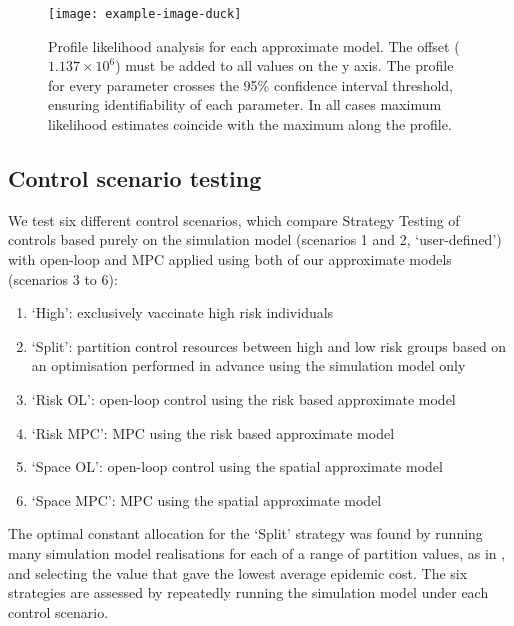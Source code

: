 \begin{figure}[h]
    \begin{center}
        \texttt{[image: example-image-duck]}
        \caption{Profile likelihood analysis for each approximate model. The offset ($1.137\times10^6$) must be added to all values on the y axis. The profile for every parameter crosses the 95\% confidence interval threshold, ensuring identifiability of each parameter. In all cases maximum likelihood estimates coincide with the maximum along the profile.}
        \label{fig:profile_lik}
    \end{center}
\end{figure}

\subsection{Control scenario testing}

We test six different control scenarios, which compare Strategy Testing of controls based purely on the simulation model (scenarios 1 and 2, `user-defined') with open-loop and MPC applied using both of our approximate models (scenarios 3 to 6):
\begin{enumerate}
    \setlength{\itemsep}{3pt}%
    \setlength{\parskip}{3pt}%
    \setlength{\parsep}{3pt}%
    \item{}`High': exclusively vaccinate high risk individuals
    \item{}`Split': partition control resources between high and low risk groups based on an optimisation performed in advance using the simulation model only
    \item{}`Risk OL': open-loop control using the risk based approximate model
    \item{}`Risk MPC': MPC using the risk based approximate model
    \item{}`Space OL': open-loop control using the spatial approximate model
    \item{}`Space MPC': MPC using the spatial approximate model
\end{enumerate}

The optimal constant allocation for the `Split' strategy was found by running many simulation model realisations for each of a range of partition values, as in \cite{cunniffe_optimising_2015}, and selecting the value that gave the lowest average epidemic cost. The six strategies are assessed by repeatedly running the simulation model under each control scenario.

